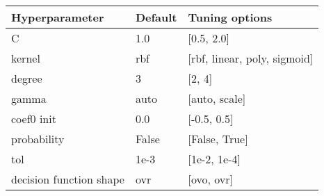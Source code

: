 
\begin{tabular}{|l|l|l|} 
\hline
\textbf{Hyperparameter}& \textbf{Default} & \textbf{Tuning options}\\
\hline
C & 1.0 & [0.5, 2.0] \\
\hline
kernel & rbf & [rbf, linear, poly, sigmoid] \\
\hline
degree & 3 & [2, 4] \\
\hline
gamma & auto& [auto, scale] \\
\hline
coef0 init & 0.0 & [-0.5, 0.5] \\
\hline
probability & False & [False, True] \\
\hline
tol & 1e-3& [1e-2, 1e-4] \\
\hline
decision function shape & ovr & [ovo, ovr] \\
\hline
\end{tabular}
